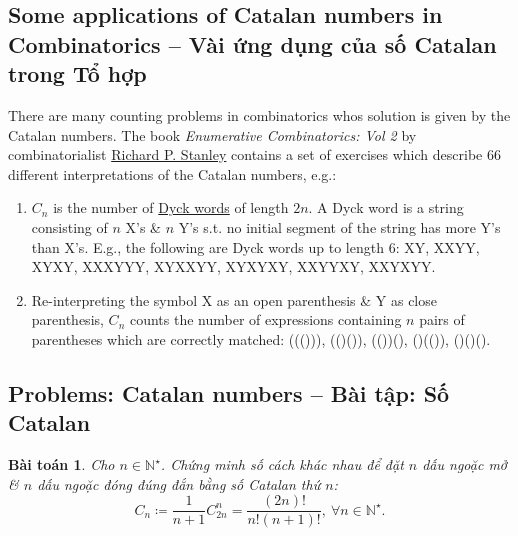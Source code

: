 \documentclass[oneside]{book}
\newtheorem{baitoan}{Bài toán}
\begin{document}
\subsection{Some applications of Catalan numbers in Combinatorics --  Vài ứng dụng của số Catalan trong Tổ hợp}
There are many counting problems in combinatorics whos solution is given by the Catalan numbers. The book {\it Enumerative Combinatorics: Vol 2} by combinatorialist \href{https://en.wikipedia.org/wiki/Richard_P._Stanley}{\sc Richard P. Stanley} contains a set of exercises which describe 66 different interpretations of the Catalan numbers, e.g.:
\begin{enumerate}
	\item $C_n$ is the number of \href{https://en.wikipedia.org/wiki/Dyck_word}{Dyck words} of length $2n$. A Dyck word is a string consisting of $n$ X's \& $n$ Y's s.t. no initial segment of the string has more Y's than X's. E.g., the following are Dyck words up to length 6:  XY, XXYY, XYXY, XXXYYY, XYXXYY, XYXYXY, XXYYXY, XXYXYY.
	\item Re-interpreting the symbol X as an open parenthesis \& Y as close parenthesis, $C_n$ counts the number of expressions containing $n$ pairs of parentheses which are correctly matched: ((())), (()()), (())(), ()(()), ()()().
\end{enumerate}



\subsection{Problems: Catalan numbers -- Bài tập: Số Catalan}

\begin{baitoan}
	Cho $n\in\mathbb{N}^\star$. Chứng minh số cách khác nhau để đặt $n$ dấu ngoặc mở \& $n$ dấu ngoặc đóng đúng đắn bằng số Catalan thứ $n$:
	\begin{equation*}
		C_n\coloneqq\frac{1}{n + 1}C_{2n}^n = \frac{(2n)!}{n!(n + 1)!},\ \forall n\in\mathbb{N}^\star.
	\end{equation*}
\end{baitoan}
\end{document}

